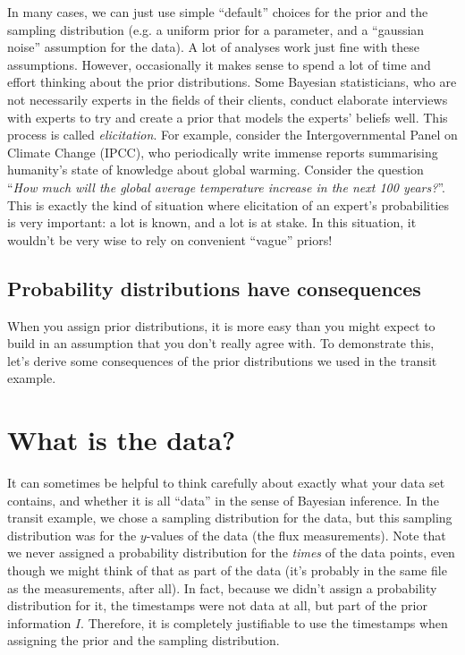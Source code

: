 In many cases, we can just use simple ``default'' choices for the prior and
the sampling distribution (e.g. a uniform prior for a parameter, and a
``gaussian noise'' assumption for the data). A lot of analyses work just fine
with these assumptions. However, occasionally it makes sense to spend a lot of
time and effort thinking about the prior distributions. Some Bayesian statisticians, who are not
necessarily experts in the fields of their clients, conduct elaborate interviews
with experts to try and create a prior that models the experts' beliefs well.
This process is called {\it elicitation}.
For example, consider the Intergovernmental Panel on Climate Change (IPCC),
who periodically write immense reports summarising humanity's state of knowledge
about global warming.
Consider the question ``{\it How much will the global average temperature
increase in the next 100 years?}''. This is exactly the kind of situation where
elicitation of an expert's probabilities is very important: a lot is known,
and a lot is at stake. In this situation, it wouldn't be very wise to rely on
convenient ``vague'' priors!

\subsection{Probability distributions have consequences}
When you assign prior distributions, it is more easy than you might expect to
build in an assumption that you don't really agree with. To demonstrate this,
let's derive some consequences of the prior distributions we used in the
transit example.


\section{What is the data?}
It can sometimes be helpful to think carefully about exactly what your data set
contains, and whether it is all ``data'' in the sense of Bayesian inference.
In the transit example, we chose a sampling distribution for the data, but this
sampling distribution was for the $y$-values of the data
(the flux measurements). Note that we never assigned a probability distribution
for the {\it times} of the data points, even though we might think of that as
part of the data (it's probably in the same file as the measurements, after all).
In fact, because we didn't assign a probability distribution for it, the
timestamps were not data at all, but part of the prior information $I$.
Therefore, it is completely justifiable to use the timestamps when assigning
the prior and the sampling distribution.



